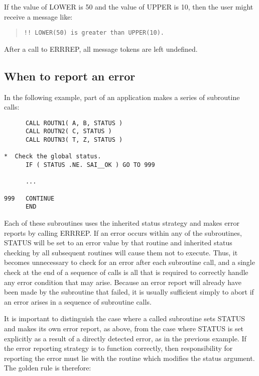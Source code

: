 \documentclass[twoside,11pt]{article}
\newcommand{\xlabel}[1]{}
\renewcommand{\_}{\texttt{\symbol{95}}}
\begin{document}
If the value of LOWER is 50 and the value of UPPER is 10, then the user
might receive a message like:

\begin {quote}
\begin {small}
\begin{verbatim}
!! LOWER(50) is greater than UPPER(10).
\end{verbatim}
\end {small}
\end {quote}

After a call to ERR\_REP, all message tokens are left undefined.


\subsection{\xlabel{when_to_report_an_error}When to report an error \label{when_sect}}

In the following example, part of an application makes a series of subroutine
calls:

\begin {small}
\begin{verbatim}
      CALL ROUTN1( A, B, STATUS )
      CALL ROUTN2( C, STATUS )
      CALL ROUTN3( T, Z, STATUS )

*  Check the global status.
      IF ( STATUS .NE. SAI__OK ) GO TO 999

      ...

999   CONTINUE
      END
\end{verbatim}
\end {small}

Each of these subroutines uses the inherited status strategy and makes 
error reports by calling ERR\_REP.
If an error occurs within any of the subroutines, STATUS will be set 
to an error value by that routine and inherited status checking by all
subsequent routines will cause them not to execute. 
Thus, it becomes unnecessary to check for an error after each subroutine
call, and a single check at the end of a sequence of calls is all that is
required to correctly handle any error condition that may arise. 
Because an error report will already have been made by the subroutine that
failed, it is usually sufficient simply to abort if an error arises in a
sequence of subroutine calls.

It is important to distinguish the case where a called subroutine sets STATUS 
and makes its own error report, as above, from the case where STATUS is set 
explicitly as a result of a directly detected error, as in the previous
example.
If the error reporting strategy is to function correctly, then responsibility 
for reporting the error must lie with the routine which modifies the status 
argument.
The golden rule is therefore:
\end{document}
